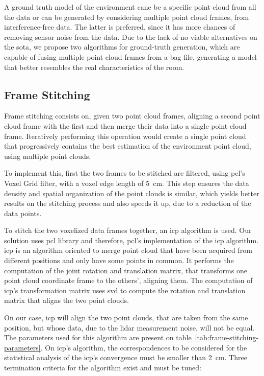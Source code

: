 A ground truth model of the environment cane be a specific point cloud from all the data or can be generated by considering multiple point cloud frames, from interference-free data. The latter is preferred, since it has more chances of removing sensor noise from the data. Due to the lack of no viable alternatives on the \acl{sota}, we propose two algorithms for ground-truth generation, which are capable of fusing multiple point cloud frames from a bag file, generating a model that better resembles the real characteristics of the room.


\subsection{Frame Stitching}
\label{subsec:lidar-interference:frame-stitching}
Frame stitching consists on, given two point cloud frames, aligning a second point cloud frame with the first and then merge their data into a single point cloud frame. Iteratively performing this operation would create a single point cloud that progressively contains the best estimation of the environment point cloud, using multiple point clouds.

To implement this, first the two frames to be stitched are filtered, using \ac{pcl}'s Voxel Grid filter, with a voxel edge length of \SI{5}{\centi\meter}. This step ensures the data density and spatial organization of the point clouds is similar, which yields better results on the stitching process and also speeds it up, due to a reduction of the data points.

To stitch the two voxelized data frames together, an \ac{icp} algorithm is used. Our solution uses \ac{pcl} library and therefore, \ac{pcl}'s implementation of the \ac{icp} algorithm. \ac{icp} is an algorithm oriented to merge point cloud that have been acquired from different positions and only have some points in common. It performs the computation of the joint rotation and translation matrix, that transforms one point cloud coordinate frame to the others', aligning them. The computation of \ac{icp}'s transformation matrix uses \ac{svd} to compute the rotation and translation matrix that aligns the two point clouds.

On our case, \ac{icp} will align the two point clouds, that are taken from the same position, but whose data, due to the \ac{lidar} measurement noise, will not be equal. The parameters used for this algorithm are present on table~\ref{tab:frame-stitching-parameters}. On \ac{icp}'s algorithm, the correspondences to be considered for the statistical analysis of the \ac{icp}'s convergence must be smaller than \SI{2}{\centi\meter}. Three termination criteria for the algorithm exist and must be tuned:

